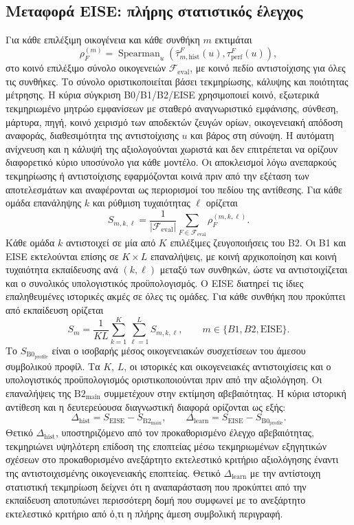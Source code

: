 \documentclass[11pt,a4paper]{article}
\begin{document}
\subsection{Μεταφορά EISE: πλήρης στατιστικός έλεγχος}\label{app:stats-eise-transfer}

Για κάθε επιλέξιμη οικογένεια και κάθε συνθήκη $m$ εκτιμάται
\[
\rho_F^{(m)}=\operatorname{Spearman}_{u}\!\left(
\widehat\tau_{m,\mathrm{hist}}^F(u),
\tau_{\mathrm{perf}}^F(u)
\right),
\]
στο κοινό επιλέξιμο σύνολο οικογενειών $\mathcal F_{\mathrm{eval}}$, με κοινό πεδίο αντιστοίχισης για όλες τις συνθήκες. Το σύνολο οριστικοποιείται βάσει τεκμηρίωσης, κάλυψης και ποιότητας μέτρησης. Η κύρια σύγκριση B0/B1/B2/EISE χρησιμοποιεί κοινό, εξωτερικά τεκμηριωμένο μητρώο εμφανίσεων με σταθερό αναγνωριστικό εμφάνισης, σύνθεση, μάρτυρα, πηγή, κοινό χειρισμό των αποδεκτών ζευγών ορίων, οικογενειακή απόδοση αναφοράς, διαθεσιμότητα της αντιστοίχισης $u$ και βάρος στη σύνοψη. Η αυτόματη ανίχνευση και η κάλυψή της αξιολογούνται χωριστά και δεν επιτρέπεται να ορίζουν διαφορετικό κύριο υποσύνολο για κάθε μοντέλο. Οι αποκλεισμοί λόγω ανεπαρκούς τεκμηρίωσης ή αντιστοίχισης εφαρμόζονται κοινά πριν από την εξέταση των αποτελεσμάτων και αναφέρονται ως περιορισμοί του πεδίου της αντίθεσης. Για κάθε ομάδα επανάληψης $k$ και ρύθμιση τυχαιότητας $\ell$ ορίζεται
\[
S_{m,k,\ell}=\frac{1}{|\mathcal F_{\mathrm{eval}}|}
\sum_{F\in\mathcal F_{\mathrm{eval}}}\rho_F^{(m,k,\ell)}.
\]
Κάθε ομάδα $k$ αντιστοιχεί σε μία από $K$ επιλέξιμες ζευγοποιήσεις του B2. Οι B1 και EISE εκτελούνται επίσης σε $K\times L$ επαναλήψεις, με κοινή αρχικοποίηση και κοινή τυχαιότητα εκπαίδευσης ανά $(k,\ell)$ μεταξύ των συνθηκών, ώστε να αντιστοιχίζεται και ο συνολικός υπολογιστικός προϋπολογισμός. Ο EISE διατηρεί τις ίδιες επαληθευμένες ιστορικές ακμές σε όλες τις ομάδες. Για κάθε συνθήκη που προκύπτει από εκπαίδευση ορίζεται
\[
S_m=\frac{1}{KL}\sum_{k=1}^{K}\sum_{\ell=1}^{L}S_{m,k,\ell},
\qquad m\in\{B1,B2,\mathrm{EISE}\}.
\]
Το $S_{\mathrm{B0}_{\mathrm{profile}}}$ είναι ο ισοβαρής μέσος οικογενειακών συσχετίσεων του άμεσου συμβολικού προφίλ. Τα $K$, $L$, οι ιστορικές και οικογενειακές αντιστοιχίσεις και ο υπολογιστικός προϋπολογισμός οριστικοποιούνται πριν από την αξιολόγηση. Οι επαναλήψεις της $\mathrm{B2}_{\mathrm{main}}$ συμμετέχουν στην εκτίμηση αβεβαιότητας. Η κύρια ιστορική αντίθεση και η δευτερεύουσα διαγνωστική διαφορά ορίζονται ως εξής:
\[
\Delta_{\mathrm{hist}}=S_{\mathrm{EISE}}-S_{\mathrm{B2}_{\mathrm{main}}},
\qquad
\Delta_{\mathrm{learn}}=S_{\mathrm{EISE}}-S_{\mathrm{B0}_{\mathrm{profile}}}.
\]
Θετικό $\Delta_{\mathrm{hist}}$, υποστηριζόμενο από τον προκαθορισμένο έλεγχο αβεβαιότητας, τεκμηριώνει υψηλότερη επίδοση της εποπτείας μέσω τεκμηριωμένων εξηγητικών σχέσεων στο προκαθορισμένο ανεξάρτητο εκτελεστικό κριτήριο αξιολόγησης έναντι της αντιστοιχισμένης οικογενειακής εποπτείας. Θετικό $\Delta_{\mathrm{learn}}$ με την αντίστοιχη στατιστική τεκμηρίωση δείχνει ότι η αναπαράσταση που προκύπτει από την εκπαίδευση αποτυπώνει περισσότερη δομή που συμφωνεί με το ανεξάρτητο εκτελεστικό κριτήριο από ό,τι η πλήρης άμεση συμβολική περιγραφή.
\end{document}
